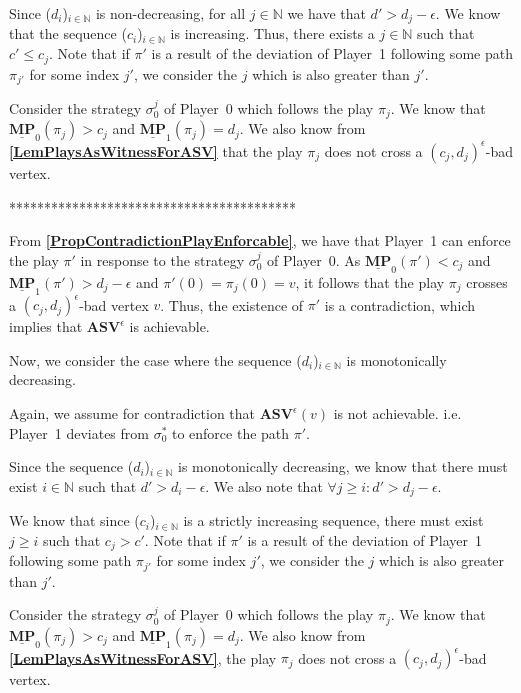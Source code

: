 Since ($d_i$)$_{i \in \mathbb{N}}$ is non-decreasing, for all $j \in \mathbb{N}$ we have that $d' > d_j - \epsilon$. We know that the sequence ($c_i$)$_{i \in \mathbb{N}}$ is increasing. Thus, there exists a $j \in \mathbb{N}$ such that $c' \leqslant c_j$. Note that if $\pi'$ is a result of the deviation of Player~1 following some path $\pi_{j'}$ for some index $j'$, we consider the $j$ which is also greater than $j'$.

Consider the strategy $\sigma_0^j$ of Player~0 which follows the play $\pi_j$. We know that $\underline{\mathbf{MP}}_0(\pi_j) > c_j$ and $\underline{\mathbf{MP}}_1(\pi_j) = d_j$. We also know from \textbf{\cref{LemPlaysAsWitnessForASV}} that the play $\pi_j$ does not cross a $(c_j, d_j)^{\epsilon}$-bad vertex. 

*****************************************

From \textbf{\cref{PropContradictionPlayEnforcable}}, we have that Player~1 can enforce the play $\pi'$ in response to the strategy $\sigma_0^j$ of Player~0. As $\underline{\mathbf{MP}}_0(\pi') < c_j$ and $ \underline{\mathbf{MP}}_1(\pi') > d_j-\epsilon$ and $\pi'(0) = \pi_j(0) = v$, it follows that the play $\pi_j$ crosses a $(c_j, d_j)^{\epsilon}$-bad vertex $v$. Thus, the existence of $\pi'$ is a contradiction, which implies that $\mathbf{ASV}^{\epsilon}$ is achievable.

Now, we consider the case where the sequence ($d_i$)$_{i \in \mathbb{N}}$ is monotonically decreasing.

Again, we assume for contradiction that $\mathbf{ASV}^{\epsilon}(v)$ is not achievable.  i.e. Player~1 deviates from $\sigma_0^*$ to enforce the path $\pi'$.

Since the sequence ($d_i$)$_{i \in \mathbb{N}}$ is monotonically decreasing, we know that there must exist $i \in \mathbb{N}$ such that $d' > d_i - \epsilon$. We also note that $\forall j \geqslant i: d' > d_j - \epsilon$.

We know that since ($c_i$)$_{i \in \mathbb{N}}$ is a strictly increasing sequence, there must exist $j \geqslant i$ such that $c_j > c'$. Note that if $\pi'$ is a result of the deviation of Player~1 following some path $\pi_{j'}$ for some index $j'$, we consider the $j$ which is also greater than $j'$.

Consider the strategy $\sigma_0^j$ of Player~0 which follows the play $\pi_j$. We know that $\underline{\mathbf{MP}}_0(\pi_j) > c_j$ and $ \underline{\mathbf{MP}}_1(\pi_j) = d_j$. We also know from \textbf{\cref{LemPlaysAsWitnessForASV}}, the play $\pi_j$ does not cross a $(c_j, d_j)^{\epsilon}$-bad vertex. 

